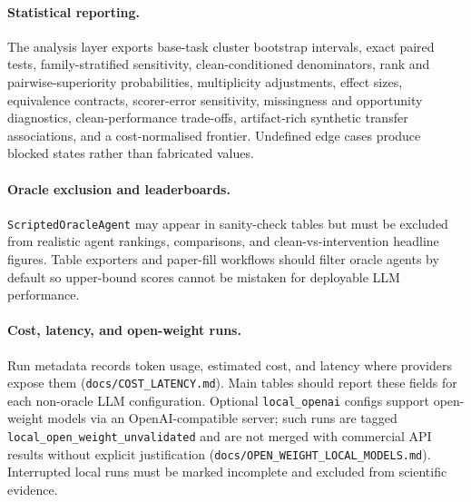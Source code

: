 \paragraph{Statistical reporting.}
The analysis layer exports base-task cluster bootstrap intervals, exact paired
tests, family-stratified sensitivity, clean-conditioned denominators, rank and
pairwise-superiority probabilities, multiplicity adjustments, effect sizes,
equivalence contracts, scorer-error sensitivity, missingness and opportunity
diagnostics, \RAAC clean-performance trade-offs, artifact-rich synthetic
transfer associations, and a cost-normalised frontier. Undefined edge cases produce blocked
states rather than fabricated values.

\paragraph{Oracle exclusion and leaderboards.}
\texttt{ScriptedOracleAgent} may appear in sanity-check tables but must be excluded from realistic agent rankings, \acrs comparisons, and clean-vs-intervention headline figures. Table exporters and paper-fill workflows should filter oracle agents by default so upper-bound scores cannot be mistaken for deployable LLM performance.

\paragraph{Cost, latency, and open-weight runs.}
Run metadata records token usage, estimated cost, and latency where providers expose them (\texttt{docs/COST\_LATENCY.md}). Main tables should report these fields for each non-oracle LLM configuration. Optional \texttt{local\_openai} configs support open-weight models via an OpenAI-compatible server; such runs are tagged \texttt{local\_open\_weight\_unvalidated} and are not merged with commercial API results without explicit justification (\texttt{docs/OPEN\_WEIGHT\_LOCAL\_MODELS.md}). Interrupted local runs must be marked incomplete and excluded from scientific evidence.
